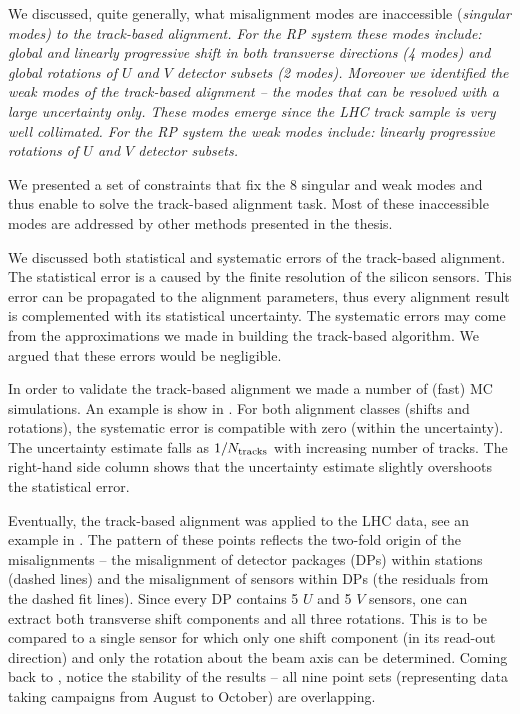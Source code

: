 We discussed, quite generally, what misalignment modes are inaccessible (\em{singular modes}) to the track-based alignment. For the RP system these modes include: global and linearly progressive shift in both transverse directions (4 modes) and global rotations of $U$ and $V$ detector subsets (2 modes). Moreover we identified the \em{weak modes} of the track-based alignment -- the modes that can be resolved with a large uncertainty only. These modes emerge since the LHC track sample is very well collimated. For the RP system the weak modes include: linearly progressive rotations of $U$ and $V$ detector subsets.

We presented a set of constraints that fix the 8 singular and weak modes and thus enable to solve the track-based alignment task. Most of these inaccessible modes are addressed by other methods presented in the thesis.

We discussed both statistical and systematic errors of the track-based alignment. The statistical error is a caused by the finite resolution of the silicon sensors. This error can be propagated to the alignment parameters, thus every alignment result is complemented with its statistical uncertainty. The systematic errors may come from the approximations we made in building the track-based algorithm. We argued that these errors would be negligible.

In order to validate the track-based alignment we made a number of (fast) MC simulations. An example is show in . For both alignment classes (shifts and rotations), the systematic error is compatible with zero (within the uncertainty). The uncertainty estimate falls as $1/N_{\rm tracks}$ with increasing number of tracks. The right-hand side column shows that the uncertainty estimate slightly overshoots the statistical error.


Eventually, the track-based alignment was applied to the LHC data, see an example in . The pattern of these points reflects the two-fold origin of the misalignments -- the misalignment of detector packages (DPs) within stations (dashed lines) and the misalignment of sensors within DPs (the residuals from the dashed fit lines). Since every DP contains 5 $U$ and 5 $V$ sensors, one can extract both transverse shift components and all three rotations. This is to be compared to a single sensor for which only one shift component (in its read-out direction) and only the rotation about the beam axis can be determined. Coming back to , notice the stability of the results -- all nine point sets (representing data taking campaigns from August to October) are overlapping. 

